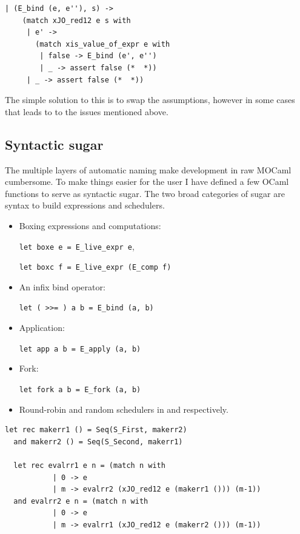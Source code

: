 \documentclass[12pt,twoside,notitlepage]{report}
\theoremstyle{plain}%
\theoremstyle{definition}
\theoremstyle{remark}
\begin{document}
\begin{minipage}{\linewidth}
\begin{lstlisting}[caption={OCaml swapped assumptions}, label={lst:ocamlswapassume}]
  | (E_bind (e, e''), s) ->
    (match xJO_red12 e s with
     | e' ->
       (match xis_value_of_expr e with
        | false -> E_bind (e', e'')
        | _ -> assert false (*  *))
     | _ -> assert false (*  *))
\end{lstlisting}

\end{minipage}
The simple solution to this is to swap the assumptions, however in some cases that leads to to the issues mentioned above.
\subsection{Syntactic sugar}
The multiple layers of automatic naming make development in raw MOCaml cumbersome.  To make things easier for the user I have defined a few OCaml functions to serve as syntactic sugar. The two broad categories of sugar are syntax to build expressions and schedulers. 
\begin{itemize}
\item{Boxing expressions and computations:

 \lstinline|let boxe e = E_live_expr e|,
 
 
 \lstinline|let boxc f = E_live_expr (E_comp f)|}
\item{An infix bind operator:


 \lstinline|let ( >>= ) a b = E_bind (a, b)|}
\item{Application:


 \lstinline|let app a b = E_apply (a, b)|}
\item{Fork:


 \lstinline|let fork a b = E_fork (a, b)|}
\item{Round-robin and random schedulers in  and  respectively.\label{sec:random_sched}}
\end{itemize}
\begin{minipage}{\linewidth}

\begin{lstlisting}[caption={OCaml round-robin scheduler}, label={lst:ocamlrrsched}]
  let rec makerr1 () = Seq(S_First, makerr2) 
  and makerr2 () = Seq(S_Second, makerr1) 
  
  let rec evalrr1 e n = (match n with 
           | 0 -> e
           | m -> evalrr2 (xJO_red12 e (makerr1 ())) (m-1))
  and evalrr2 e n = (match n with 
           | 0 -> e
           | m -> evalrr1 (xJO_red12 e (makerr2 ())) (m-1))
\end{lstlisting}

\end{minipage}
\end{document}
